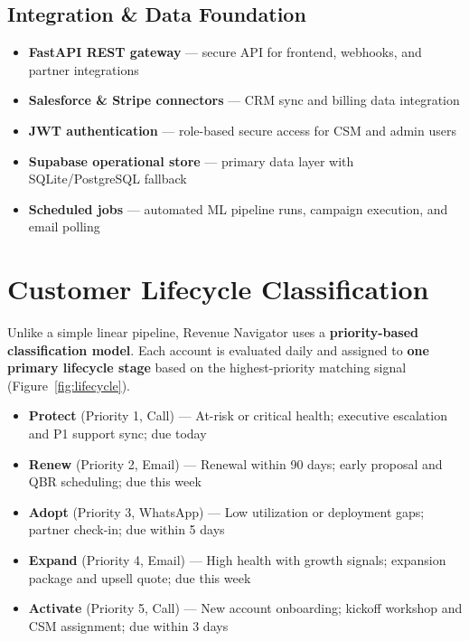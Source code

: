 \documentclass[11pt,a4paper]{article}
\begin{document}
\subsection{Integration \& Data Foundation}

\begin{itemize}[leftmargin=1.5em, itemsep=0.25em]
    \item \textbf{FastAPI REST gateway} --- secure API for frontend, webhooks, and partner integrations
    \item \textbf{Salesforce \& Stripe connectors} --- CRM sync and billing data integration
    \item \textbf{JWT authentication} --- role-based secure access for CSM and admin users
    \item \textbf{Supabase operational store} --- primary data layer with SQLite/PostgreSQL fallback
    \item \textbf{Scheduled jobs} --- automated ML pipeline runs, campaign execution, and email polling
\end{itemize}

\section{Customer Lifecycle Classification}

Unlike a simple linear pipeline, Revenue Navigator uses a \textbf{priority-based classification model}. Each account is evaluated daily and assigned to \textbf{one primary lifecycle stage} based on the highest-priority matching signal (Figure~\ref{fig:lifecycle}).

\begin{itemize}[leftmargin=1.5em, itemsep=0.3em]
    \item \textbf{Protect} (Priority 1, Call) --- At-risk or critical health; executive escalation and P1 support sync; due today
    \item \textbf{Renew} (Priority 2, Email) --- Renewal within 90 days; early proposal and QBR scheduling; due this week
    \item \textbf{Adopt} (Priority 3, WhatsApp) --- Low utilization or deployment gaps; partner check-in; due within 5 days
    \item \textbf{Expand} (Priority 4, Email) --- High health with growth signals; expansion package and upsell quote; due this week
    \item \textbf{Activate} (Priority 5, Call) --- New account onboarding; kickoff workshop and CSM assignment; due within 3 days
\end{itemize}
\end{document}
